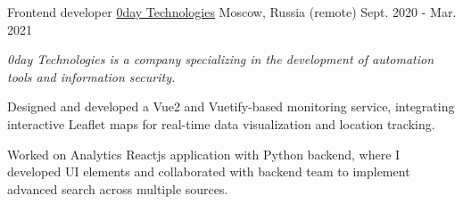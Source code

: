 \begin{cventries}
 \cventry
    {Frontend developer} %
    {\href{https://0day.llc/}{0day Technologies}}
    {Moscow, Russia (remote)} %
    {Sept. 2020 - Mar. 2021} %
    {
      \begin{cvitems} %
      \vspace{8pt}
      \item[] {\small\textit{0day Technologies is a company specializing in the development of automation tools and information security.}}
      \vspace{8pt}
        \item {Designed and developed a Vue2 and Vuetify-based monitoring service, integrating interactive Leaflet maps for real-time data visualization and location tracking.}
        \item {Worked on Analytics Reactjs application with Python backend,
        where I developed UI elements and collaborated with backend team to implement advanced search across multiple sources.}
      \end{cvitems}
    }
    {\vspace{16pt}}

\end{cventries}
